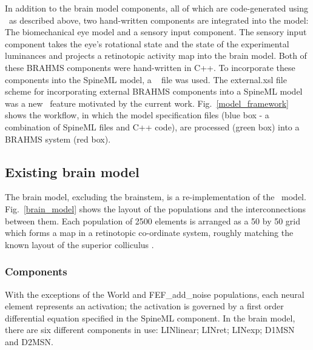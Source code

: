 \documentclass{frontiersSCNS}
\begin{document}
In addition to the brain model components, all of which are
code-generated using \stob~as described above, two hand-written
components are integrated into the model: The biomechanical eye model
and a sensory input component. The sensory input component takes the
eye's rotational state and the state of the experimental luminances
and projects a retinotopic activity map into the brain model. Both of
these BRAHMS components were hand-written in C++. To incorporate these
components into the SpineML model, a \stob~ file was used.
The external.xsl file scheme for incorporating external BRAHMS components
into a SpineML model was a new \stob~feature motivated by the current work.
Fig.~\ref{model_framework} shows the workflow, in which the
model specification files (blue box - a combination of SpineML files
and C++ code), are processed (green box) into a BRAHMS system (red
box).

\subsection{Existing brain model}

The brain model, excluding the brainstem, is a re-implementation of
the \ccg~model. Fig.~\ref{brain_model} shows the layout of the
populations and the interconnections between them. Each population of
2500 elements is arranged as a 50 by 50 grid which forms a map in a
retinotopic co-ordinate system, roughly matching the known layout of
the superior colliculus \citep{robinson_eye_1972}. %

\subsubsection{Components}

With the exceptions of the World and FEF\_add\_noise populations, each
neural element represents an activation; the activation is governed by
a first order differential equation specified in the SpineML
component. In the brain model, there are six different components in
use: LINlinear; LINret; LINexp; D1MSN and D2MSN.
\end{document}
